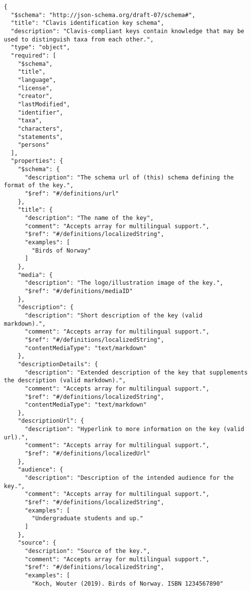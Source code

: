 \documentclass[10pt,letterpaper]{article}
\begin{document}
\vspace*{0.2in}

\begin{flushleft}
{\Large
\textbf{}}
\newline
\end{flushleft}
\linenumbers
\begin{verbatim}
{
  "$schema": "http://json-schema.org/draft-07/schema#",
  "title": "Clavis identification key schema",
  "description": "Clavis-compliant keys contain knowledge that may be
used to distinguish taxa from each other.",
  "type": "object",
  "required": [
    "$schema",
    "title",
    "language",
    "license",
    "creator",
    "lastModified",
    "identifier",
    "taxa",
    "characters",
    "statements",
    "persons"
  ],
  "properties": {
    "$schema": {
      "description": "The schema url of (this) schema defining the
format of the key.",
      "$ref": "#/definitions/url"
    },
    "title": {
      "description": "The name of the key",
      "comment": "Accepts array for multilingual support.",
      "$ref": "#/definitions/localizedString",
      "examples": [
        "Birds of Norway"
      ]
    },
    "media": {
      "description": "The logo/illustration image of the key.",
      "$ref": "#/definitions/mediaID"
    },
    "description": {
      "description": "Short description of the key (valid
markdown).",
      "comment": "Accepts array for multilingual support.",
      "$ref": "#/definitions/localizedString",
      "contentMediaType": "text/markdown"
    },
    "descriptionDetails": {
      "description": "Extended description of the key that supplements
the description (valid markdown).",
      "comment": "Accepts array for multilingual support.",
      "$ref": "#/definitions/localizedString",
      "contentMediaType": "text/markdown"
    },
    "descriptionUrl": {
      "description": "Hyperlink to more information on the key (valid
url).",
      "comment": "Accepts array for multilingual support.",
      "$ref": "#/definitions/localizedUrl"
    },
    "audience": {
      "description": "Description of the intended audience for the
key.",
      "comment": "Accepts array for multilingual support.",
      "$ref": "#/definitions/localizedString",
      "examples": [
        "Undergraduate students and up."
      ]
    },
    "source": {
      "description": "Source of the key.",
      "comment": "Accepts array for multilingual support.",
      "$ref": "#/definitions/localizedString",
      "examples": [
        "Koch, Wouter (2019). Birds of Norway. ISBN 1234567890"

\end{verbatim}
\end{document}
